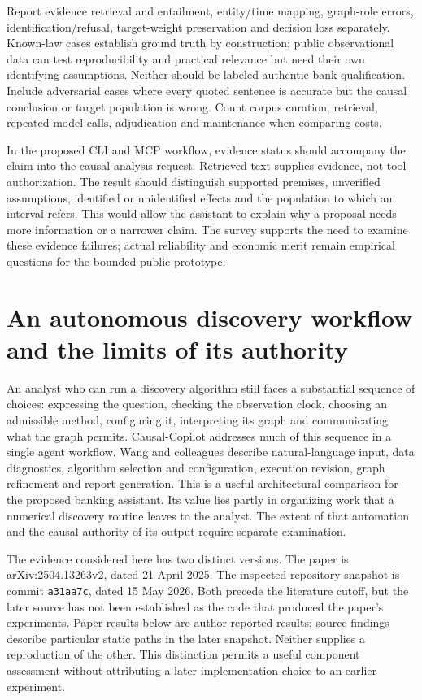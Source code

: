 Report evidence retrieval and entailment, entity/time mapping, graph-role
errors, identification/refusal, target-weight preservation and decision loss
separately. Known-law cases establish ground truth by construction; public
observational data can test reproducibility and practical relevance but need
their own identifying assumptions. Neither should be labeled authentic bank
qualification. Include adversarial cases where every quoted sentence is
accurate but the causal conclusion or target population is wrong. Count corpus
curation, retrieval, repeated model calls, adjudication and maintenance when
comparing costs.

In the proposed CLI and MCP workflow, evidence status should accompany the
claim into the causal analysis request. Retrieved text supplies evidence, not
tool authorization. The result should distinguish supported premises,
unverified assumptions, identified or unidentified effects and the population
to which an interval refers. This would allow the assistant to explain why a
proposal needs more information or a narrower claim. The survey supports the
need to examine these evidence failures; actual reliability and economic merit
remain empirical questions for the bounded public prototype.


\section{An autonomous discovery workflow and the limits of its authority}
\label{exec17:copilot-development}

An analyst who can run a discovery algorithm still faces a substantial sequence
of choices: expressing the question, checking the observation clock, choosing
an admissible method, configuring it, interpreting its graph and communicating
what the graph permits. Causal-Copilot addresses much of this sequence in a
single agent workflow. Wang and colleagues describe natural-language input,
data diagnostics, algorithm selection and configuration, execution revision,
graph refinement and report generation. This is a useful architectural
comparison for the proposed banking assistant. Its value lies partly in
organizing work that a numerical discovery routine leaves to the analyst.
The extent of that automation and the causal authority of its output require
separate examination.~\citep{exec17_copilot_paper}

The evidence considered here has two distinct versions. The paper is
arXiv:2504.13263v2, dated 21 April 2025. The inspected repository snapshot is
commit \texttt{a31aa7c}, dated 15 May 2026. Both precede the literature cutoff,
but the later source has not been established as the code that produced the
paper's experiments. Paper results below are author-reported results;
source findings describe particular static paths in the later snapshot.
Neither supplies a reproduction of the other. This distinction permits a
useful component assessment without attributing a later implementation choice
to an earlier experiment.~\citep{exec17_copilot_paper,exec17_copilot_code}

